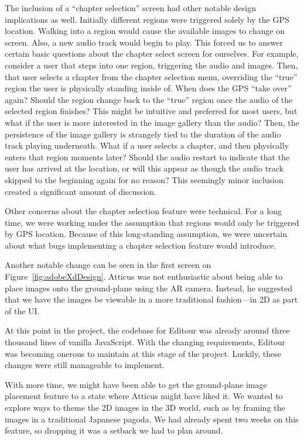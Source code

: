 \documentclass[a4paper, 10pt, american, titlepage]{article}
\begin{document}
The inclusion of a ``chapter selection'' screen had other notable design
implications as well. Initially different regions were triggered solely by the
GPS location. Walking into a region would cause the available images to change
on screen. Also, a new audio track would begin to play. This forced us to answer
certain basic questions about the chapter select screen for ourselves. For
example, consider a user that steps into one region, triggering the audio and
images. Then, that user selects a chapter from the chapter selection menu,
overriding the ``true'' region the user is physically standing inside of. When
does the GPS ``take over'' again? Should the region change back to the ``true''
region once the audio of the selected region finishes? This might be intuitive
and preferred for most users, but what if the user is more interested in the
image gallery than the audio? Then, the persistence of the image gallery is
strangely tied to the duration of the audio track playing underneath. What if a
user selects a chapter, and then physically enters that region moments later?
Should the audio restart to indicate that the user has arrived at the location,
or will this appear as though the audio track skipped to the beginning again for
no reason? This seemingly minor inclusion created a significant amount of
discussion.

Other concerns about the chapter selection feature were technical. For a long
time, we were working under the assumption that regions would only be triggered
by GPS location. Because of this long-standing assumption, we were uncertain
about what bugs implementing a chapter selection feature would introduce.

Another notable change can be seen in the first screen on
Figure~\ref{fig:adobeXdDesign}. Atticus was not enthusiastic about being able
to place images onto the ground-plane using the AR camera. Instead, he
suggested that we have the images be viewable in a more traditional
fashion---in 2D as part of the UI.

At this point in the project, the codebase for Editour was already around three
thousand lines of vanilla JavaScript. With the changing requirements, Editour
was becoming onerous to maintain at this stage of the project. Luckily, these
changes were still manageable to implement.

With more time, we might have been able to get the ground-plane image placement
feature to a state where Atticus might have liked it. We wanted to explore ways
to theme the 2D images in the 3D world, such as by framing the images in a
traditional Japanese pagoda. We had already spent two weeks on this feature, so
dropping it was a setback we had to plan around.
\end{document}
